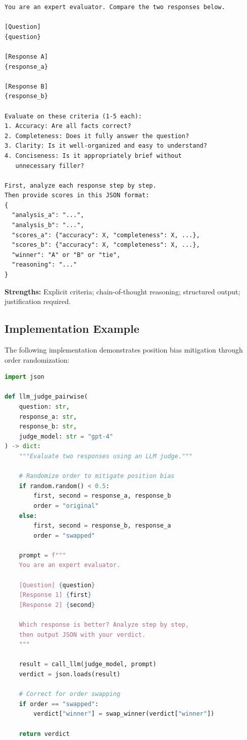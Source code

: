 \begin{goodexample}
\begin{lstlisting}[basicstyle=\small\ttfamily]
You are an expert evaluator. Compare the two responses below.

[Question]
{question}

[Response A]
{response_a}

[Response B]
{response_b}

Evaluate on these criteria (1-5 each):
1. Accuracy: Are all facts correct?
2. Completeness: Does it fully answer the question?
3. Clarity: Is it well-organized and easy to understand?
4. Conciseness: Is it appropriately brief without 
   unnecessary filler?

First, analyze each response step by step.
Then provide scores in this JSON format:
{
  "analysis_a": "...",
  "analysis_b": "...",
  "scores_a": {"accuracy": X, "completeness": X, ...},
  "scores_b": {"accuracy": X, "completeness": X, ...},
  "winner": "A" or "B" or "tie",
  "reasoning": "..."
}
\end{lstlisting}
\textbf{Strengths:} Explicit criteria; chain-of-thought reasoning; structured output; justification required.
\end{goodexample}

\subsection{Implementation Example}

The following implementation demonstrates position bias mitigation through order randomization:

\begin{lstlisting}[basicstyle=\small\ttfamily,language=Python]
import json

def llm_judge_pairwise(
    question: str,
    response_a: str, 
    response_b: str,
    judge_model: str = "gpt-4"
) -> dict:
    """Evaluate two responses using an LLM judge."""
    
    # Randomize order to mitigate position bias
    if random.random() < 0.5:
        first, second = response_a, response_b
        order = "original"
    else:
        first, second = response_b, response_a
        order = "swapped"
    
    prompt = f"""
    You are an expert evaluator. 
    
    [Question] {question}
    [Response 1] {first}
    [Response 2] {second}
    
    Which response is better? Analyze step by step,
    then output JSON with your verdict.
    """
    
    result = call_llm(judge_model, prompt)
    verdict = json.loads(result)
    
    # Correct for order swapping
    if order == "swapped":
        verdict["winner"] = swap_winner(verdict["winner"])
    
    return verdict
\end{lstlisting}

